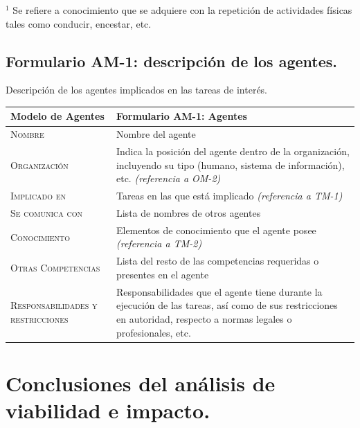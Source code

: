 \documentclass[12pt,a4paper,twoside,spanish]{article}      %
\begin{document}
{\scriptsize \noindent $^1$ Se refiere a conocimiento que se
adquiere con la repetición de actividades físicas tales como
conducir, encestar, etc.}

\pagebreak
\subsection{Formulario AM-1: descripción de los agentes.}

Descripción de los agentes implicados en las tareas de interés.

\begin{table}[H]
\scriptsize
\begin{tabularx}{\textwidth}{|l|X|} \hline
\textbf{Modelo de Agentes} & \textbf{Formulario AM-1: Agentes} \\ \hline\hline
\textsc{Nombre} &  Nombre del agente \\ \hline
\textsc{Organización} &  Indica la posición del agente dentro de la organización, incluyendo su tipo (humano, sistema de información), etc. \emph{(referencia a OM-2)}\\ \hline
\textsc{Implicado en} & Tareas en las que está implicado \emph{(referencia a TM-1)} \\ \hline
\textsc{Se comunica con} &  Lista de nombres de otros agentes  \\ \hline
\textsc{Conocimiento} &  Elementos de conocimiento que el agente posee \emph{(referencia a TM-2)} \\ \hline
\textsc{Otras Competencias} &  Lista del resto de las competencias requeridas o presentes en el agente \\ \hline
\textsc{Responsabilidades y restricciones} &  Responsabilidades que el agente tiene durante la ejecución de las
tareas, así como de sus restricciones en autoridad, respecto a normas legales o
profesionales, etc.\\ \hline
\end{tabularx}
 \label{tab.AM1}
\end{table}


\pagebreak
\section{Conclusiones del análisis de viabilidad e impacto.}
\end{document}

